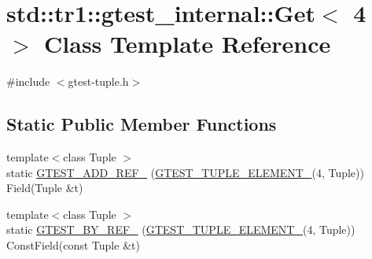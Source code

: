 \hypertarget{classstd_1_1tr1_1_1gtest__internal_1_1_get_3_014_01_4}{\section{std\+:\+:tr1\+:\+:gtest\+\_\+internal\+:\+:Get$<$ 4 $>$ Class Template Reference}
\label{classstd_1_1tr1_1_1gtest__internal_1_1_get_3_014_01_4}
}


{\ttfamily \#include $<$gtest-\/tuple.\+h$>$}

\subsection*{Static Public Member Functions}
\begin{DoxyCompactItemize}
\item 
{\footnotesize template$<$class Tuple $>$ }\\static \hyperlink{classstd_1_1tr1_1_1gtest__internal_1_1_get_3_014_01_4_a5c7a91c681118bb7253e305f8ff42be4}{G\+T\+E\+S\+T\+\_\+\+A\+D\+D\+\_\+\+R\+E\+F\+\_\+} (\hyperlink{gtest-tuple_8h_a1b7f133d8aa02e0b7afed7b66781eeb7}{G\+T\+E\+S\+T\+\_\+\+T\+U\+P\+L\+E\+\_\+\+E\+L\+E\+M\+E\+N\+T\+\_\+}(4, Tuple)) Field(Tuple \&t)
\item 
{\footnotesize template$<$class Tuple $>$ }\\static \hyperlink{classstd_1_1tr1_1_1gtest__internal_1_1_get_3_014_01_4_a04794c398bbe81e4de0915b79da2166a}{G\+T\+E\+S\+T\+\_\+\+B\+Y\+\_\+\+R\+E\+F\+\_\+} (\hyperlink{gtest-tuple_8h_a1b7f133d8aa02e0b7afed7b66781eeb7}{G\+T\+E\+S\+T\+\_\+\+T\+U\+P\+L\+E\+\_\+\+E\+L\+E\+M\+E\+N\+T\+\_\+}(4, Tuple)) Const\+Field(const Tuple \&t)
\end{DoxyCompactItemize}


